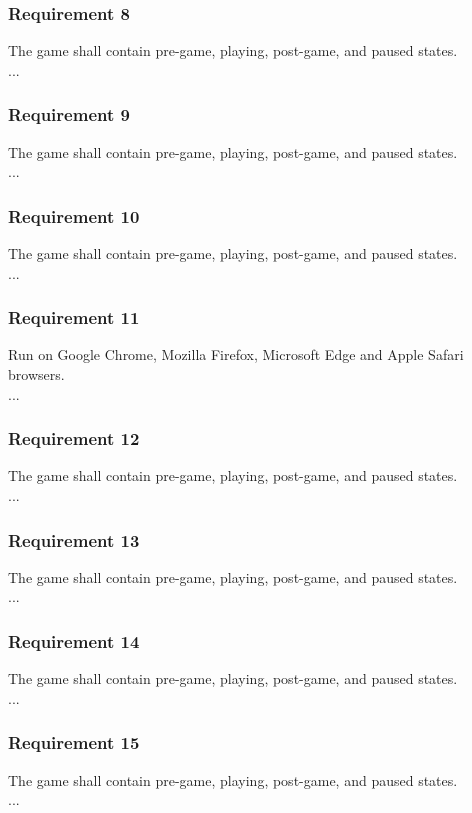 \documentclass[12pt, titlepage]{article}
\begin{document}
\subsubsection{Requirement 8}
The game shall contain pre-game, playing, post-game, and paused states.\\
...\\
\subsubsection{Requirement 9}
The game shall contain pre-game, playing, post-game, and paused states.\\
...\\
\subsubsection{Requirement 10}
The game shall contain pre-game, playing, post-game, and paused states.\\
...\\
\subsubsection{Requirement 11}
Run on Google Chrome, Mozilla Firefox, Microsoft Edge and Apple Safari browsers.\\
...\\
\subsubsection{Requirement 12}
The game shall contain pre-game, playing, post-game, and paused states.\\
...\\
\subsubsection{Requirement 13}
The game shall contain pre-game, playing, post-game, and paused states.\\
...\\
\subsubsection{Requirement 14}
The game shall contain pre-game, playing, post-game, and paused states.\\
...\\
\subsubsection{Requirement 15}
The game shall contain pre-game, playing, post-game, and paused states.\\
...\\
\end{document}
